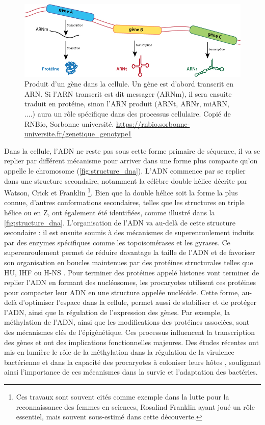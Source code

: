 \begin{figure}[htbp]
    \centering
    \includegraphics[width=\linewidth]{images/gene2prot.jpg}
    \caption[Produit d'un gène]{Produit d'un gène dans la cellule. Un gène est d'abord transcrit en ARN. Si l'ARN transcrit est dit messager (ARNm), il sera ensuite traduit en protéine, sinon l'ARN produit (ARNt, ARNr, miARN, ....) aura un rôle spécifique dans des processus cellulaire. Copié de RNBio, Sorbonne université. \url{https://rnbio.sorbonne-universite.fr/genetique_genotype1}}
    \label{fig:gene2prod}
\end{figure}


Dans la cellule, l'ADN ne reste pas sous cette forme primaire de séquence, il va se replier par différent mécanisme pour arriver dans une forme plus compacte qu'on appelle le chromosome (\autoref{fig:structure_dna}). L'ADN commence par se replier dans une structure secondaire, notamment la célèbre double hélice décrite par Watson, Crick et Franklin \cite{watson_molecular_1953}\footnote{Ces travaux sont souvent cités comme exemple dans la lutte pour la reconnaissance des femmes en sciences, Rosalind Franklin ayant joué un rôle essentiel, mais souvent sous-estimé dans cette découverte.}. Bien que la double hélice soit la forme la plus connue, d'autres conformations secondaires, telles que les structures en triple hélice ou en Z, ont également été identifiées, comme illustré dans la \autoref{fig:structure_dna}. L'organisation de l'ADN va au-delà de cette structure secondaire : il est ensuite soumis à des mécanismes de superenroulement induits par des enzymes spécifiques comme les topoisomérases et les gyrases. Ce superenroulement permet de réduire davantage la taille de l'ADN et de favoriser son organisation en boucles maintenues par des protéines structurales telles que HU, IHF ou H-NS \cite{williams_molecular_1997,prieto_genomic_2012}. Pour terminer des protéines appelé histones vont terminer de replier l'ADN en formant des nucléosomes, les procaryotes utilisent ces protéines pour compacter leur ADN en une structure appelée nucléoïde. Cette forme, au-delà d'optimiser l'espace dans la cellule, permet aussi de stabiliser et de protéger l'ADN, ainsi que la régulation de l’expression des gènes. Par exemple, la méthylation de l’ADN, ainsi que les modifications des protéines associées, sont des mécanismes clés de l’épigénétique. Ces processus influencent la transcription des gènes et ont des implications fonctionnelles majeures. Des études récentes ont mis en lumière le rôle de la méthylation dans la régulation de la virulence bactérienne et dans la capacité des procaryotes à coloniser leurs hôtes \cite{oliveira_bacterial_2021}, soulignant ainsi l'importance de ces mécanismes dans la survie et l’adaptation des bactéries.

